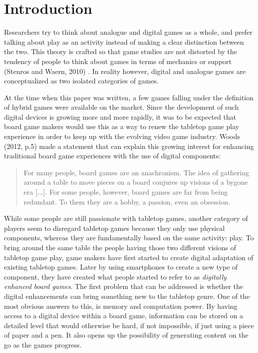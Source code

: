 \chapter{Introduction}
Researchers try to think about analogue and digital games as a whole, and prefer talking about play as an activity instead of making a clear distinction between the two. This theory is crafted so that game studies are not distorted by the tendency of people to think about games in terms of mechanics or support (Stenros and Waern, 2010) \cite{art:stenroswaern}. In reality however, digital and analogue games are conceptualized as two isolated categories of games.

At the time when this paper was written, a few games falling under the definition of hybrid games were available on the market. Since the development of such digital devices is growing more and more rapidly, it was to be expected that board game makers would use this as a way to renew the tabletop game play experience in order to keep up with the evolving video game industry. Woods (2012, p.5) \cite{book:euro} made a statement that can explain this growing interest for enhancing traditional board game experiences with the use of digital components:

\begin{quotation}
For many people, board games are an anachronism. The idea of gathering around a table to move pieces on a board conjures up visions of a bygone era [...]. For some people, however, board games are far from being redundant. To them they are a hobby, a passion, even an obsession.
\end{quotation}

While some people are still passionate with tabletop games, another category of players seem to disregard tabletop games because they only use physical components, whereas they are fundamentally based on the same activity: play. To bring around the same table the people having those two different visions of tabletop game play, game makers have first started to create digital adaptation of existing tabletop games. Later by using smartphones to create a new type of component, they have created what people started to refer to as \textit{digitally enhanced board games}. The first problem that can be addressed is whether the digital enhancements can bring something new to the tabletop genre. One of the most obvious answers to this, is memory and computation power. By having access to a digital device within a board game, information can be stored on a detailed level that would otherwise be hard, if not impossible, if just using a piece of paper and a pen. 
It also opens up the possibility of generating content on the go as the games progress. 

